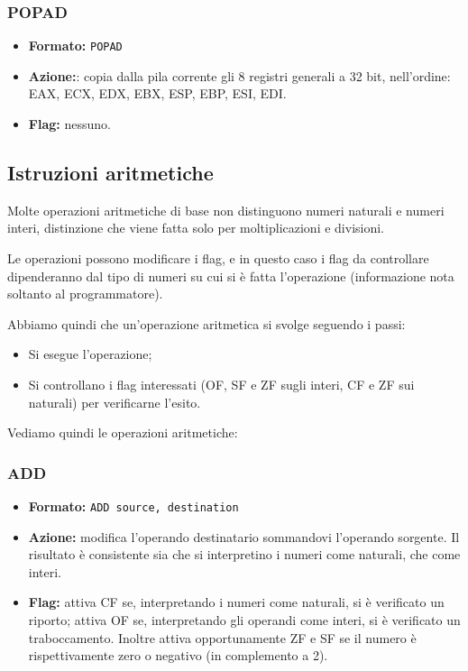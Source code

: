 \documentclass[a4paper,11pt]{article}
\begin{document}
\subsubsection{POPAD}
\begin{itemize}
	\item \textbf{Formato:} \lstinline|POPAD|
	\item \textbf{Azione:}: copia dalla pila corrente gli 8 registri generali a 32 bit, nell'ordine: EAX, ECX, EDX, EBX, ESP, EBP, ESI, EDI. 
	\item \textbf{Flag:} nessuno.
\end{itemize}

\subsection{Istruzioni aritmetiche}
Molte operazioni aritmetiche di base non distinguono numeri naturali e numeri interi, distinzione che viene fatta solo per moltiplicazioni e divisioni.

Le operazioni possono modificare i flag, e in questo caso i flag da controllare dipenderanno dal tipo di numeri su cui si è fatta l'operazione (informazione nota soltanto al programmatore).

Abbiamo quindi che un'operazione aritmetica si svolge seguendo i passi:
\begin{itemize}
	\item Si esegue l'operazione;
	\item Si controllano i flag interessati (OF, SF e ZF sugli interi, CF e ZF sui naturali) per verificarne l'esito.
\end{itemize}

Vediamo quindi le operazioni aritmetiche:

\subsubsection{ADD}
\begin{itemize}
	\item \textbf{Formato:} \lstinline|ADD source, destination|
	\item \textbf{Azione:} modifica l'operando destinatario sommandovi l'operando sorgente.
		Il risultato è consistente sia che si interpretino i numeri come naturali, che come interi.
	\item \textbf{Flag:} attiva CF se, interpretando i numeri come naturali, si è verificato un riporto; attiva OF se, interpretando gli operandi come interi, si è verificato un traboccamento.
		Inoltre attiva opportunamente ZF e SF se il numero è rispettivamente zero o negativo (in complemento a 2).
\end{itemize}
\end{document}
